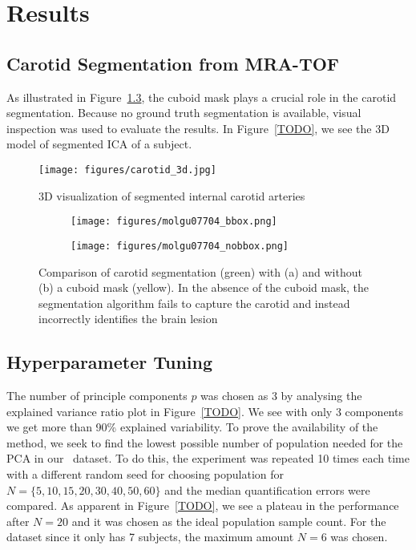 \chapter{Results}
\section{Carotid Segmentation from MRA-TOF}
As illustrated in Figure~\ref{fig:seg_compare}, the cuboid mask plays a crucial role in the carotid segmentation.
Because no ground truth segmentation is available, visual inspection was used to evaluate the results.
In Figure~\ref{TODO}, we see the 3D model of segmented ICA of a subject.

\begin{figure}[h]
	\centering
	\texttt{[image: figures/carotid\_3d.jpg]}
	\caption{3D visualization of segmented internal carotid arteries}
\end{figure}

\begin{figure}[h]
	\centering
	\begin{subfigure}{0.45\textwidth}
		\texttt{[image: figures/molgu07704\_bbox.png]}
		\caption{}
		\label{subfig:seg_bbox}
	\end{subfigure}
	\begin{subfigure}{0.45\textwidth}
		\texttt{[image: figures/molgu07704\_nobbox.png]}
		\caption{}
		\label{subfig:seg_nobbox}
	\end{subfigure}
	\caption{Comparison of carotid segmentation (green) with (a) and without (b) a cuboid mask (yellow). In the absence of the cuboid mask, the segmentation algorithm fails to capture the carotid and instead incorrectly identifies the brain lesion}
	\label{fig:seg_compare}
\end{figure}


\section{Hyperparameter Tuning}
The number of principle components $p$ was chosen as 3 by analysing the explained variance ratio plot in Figure~\ref{TODO}.
We see with only 3 components we get more than 90\% explained variability.
To prove the availability of the method, we seek to find the lowest possible number of population needed for the PCA in our \fdg $\,$ dataset.
To do this, the experiment was repeated 10 times each time with a different random seed for choosing population for $N=\{5,10,15,20,30,40,50,60\}$ and the median quantification errors were compared.
As apparent in Figure~\ref{TODO}, we see a plateau in the performance after $N=20$ and it was chosen as the ideal population sample count.
For the \yohimbine$\,$ dataset since it only has 7 subjects, the maximum amount $N=6$ was chosen.


